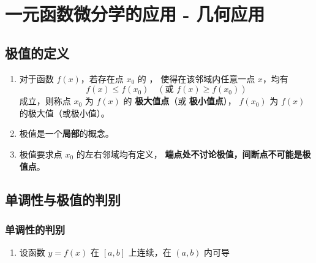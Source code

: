 \documentclass[../book.tex]{subfiles}
\begin{document}
    \section{一元函数微分学的应用 - 几何应用}

    \subsection{极值的定义}
    \begin{enumerate}
        \item 对于函数 $f(x)$，若存在点 $x_0$ 的 {\color{red}{某个邻域}}，
        使得在该邻域内任意一点 $x$，均有
        \[
            f(x) \le f(x_0)\quad (\text{或 } f(x) \ge f(x_0))
        \]
        成立，则称点 $x_0$ 为 $f(x)$ 的
        \textbf{极大值点}（或 \textbf{极小值点}），
        $f(x_0)$ 为 $f(x)$ 的极大值（或极小值）。

        \item 极值是一个\textbf{局部}的概念。

        \item 极值要求点 $x_0$ 的左右邻域均有定义，
        \textbf{端点处不讨论极值，间断点不可能是极值点}。
    \end{enumerate}

    \subsection{单调性与极值的判别}

    \subsubsection{单调性的判别}
    \begin{enumerate}
        \item 设函数 $y = f(x)$ 在 $[a,b]$ 上连续，在 $(a,b)$ 内可导

    \end{enumerate}
\end{document}
